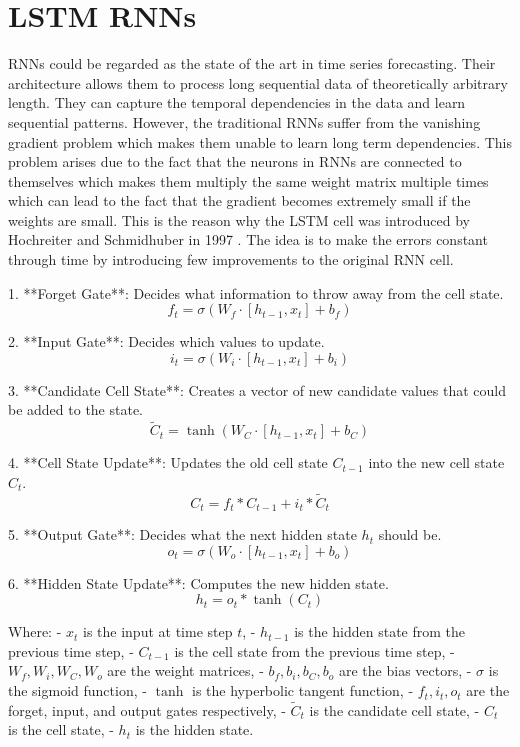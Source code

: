 \section{\acl{LSTM} \acl{RNN}s}

\acl{RNN}s could be regarded as the state of the art in time series forecasting.
Their architecture allows them to process long sequential data
of theoretically arbitrary length. They can capture the temporal dependencies
in the data and learn sequential patterns. However, the traditional \ac{RNN}s
suffer from the vanishing gradient problem which makes them unable to learn 
long term dependencies. This problem arises
due to the fact that the neurons in \ac{RNN}s are connected to themselves
which makes them multiply the same weight matrix multiple
times which can lead to the fact that the gradient becomes extremely small if the 
weights are small. This is the reason why the \ac{LSTM} cell was
introduced by Hochreiter and Schmidhuber in 1997 \cite{Hochreiter1997}.
The idea is to make the errors constant through time by introducing few improvements
to the original \ac{RNN} cell.





1. **Forget Gate**: Decides what information to throw away from the cell state.
\[
f_t = \sigma(W_f \cdot [h_{t-1}, x_t] + b_f)
\]

2. **Input Gate**: Decides which values to update.
\[
i_t = \sigma(W_i \cdot [h_{t-1}, x_t] + b_i)
\]

3. **Candidate Cell State**: Creates a vector of new candidate values that could be added to the state.
\[
\tilde{C}_t = \tanh(W_C \cdot [h_{t-1}, x_t] + b_C)
\]

4. **Cell State Update**: Updates the old cell state \(C_{t-1}\) into the new cell state \(C_t\).
\[
C_t = f_t * C_{t-1} + i_t * \tilde{C}_t
\]

5. **Output Gate**: Decides what the next hidden state \(h_t\) should be.
\[
o_t = \sigma(W_o \cdot [h_{t-1}, x_t] + b_o)
\]

6. **Hidden State Update**: Computes the new hidden state.
\[
h_t = o_t * \tanh(C_t)
\]

Where:
- \(x_t\) is the input at time step \(t\),
- \(h_{t-1}\) is the hidden state from the previous time step,
- \(C_{t-1}\) is the cell state from the previous time step,
- \(W_f, W_i, W_C, W_o\) are the weight matrices,
- \(b_f, b_i, b_C, b_o\) are the bias vectors,
- \(\sigma\) is the sigmoid function,
- \(\tanh\) is the hyperbolic tangent function,
- \(f_t, i_t, o_t\) are the forget, input, and output gates respectively,
- \(\tilde{C}_t\) is the candidate cell state,
- \(C_t\) is the cell state,
- \(h_t\) is the hidden state.



